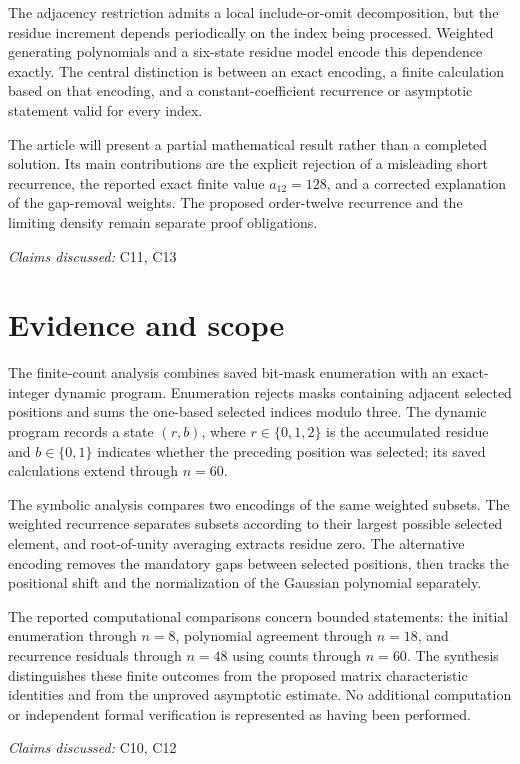 \documentclass[11pt]{article}
\begin{document}
The adjacency restriction admits a local include-or-omit decomposition, but the residue increment depends periodically on the index being processed. Weighted generating polynomials and a six-state residue model encode this dependence exactly. The central distinction is between an exact encoding, a finite calculation based on that encoding, and a constant-coefficient recurrence or asymptotic statement valid for every index.

The article will present a partial mathematical result rather than a completed solution. Its main contributions are the explicit rejection of a misleading short recurrence, the reported exact finite value $a_{12}=128$, and a corrected explanation of the gap-removal weights. The proposed order-twelve recurrence and the limiting density remain separate proof obligations.

\textit{Claims discussed: }C11, C13
\section{Evidence and scope}
The finite-count analysis combines saved bit-mask enumeration with an exact-integer dynamic program. Enumeration rejects masks containing adjacent selected positions and sums the one-based selected indices modulo three. The dynamic program records a state $(r,b)$, where $r\in\{0,1,2\}$ is the accumulated residue and $b\in\{0,1\}$ indicates whether the preceding position was selected; its saved calculations extend through $n=60$.

The symbolic analysis compares two encodings of the same weighted subsets. The weighted recurrence separates subsets according to their largest possible selected element, and root-of-unity averaging extracts residue zero. The alternative encoding removes the mandatory gaps between selected positions, then tracks the positional shift and the normalization of the Gaussian polynomial separately.

The reported computational comparisons concern bounded statements: the initial enumeration through $n=8$, polynomial agreement through $n=18$, and recurrence residuals through $n=48$ using counts through $n=60$. The synthesis distinguishes these finite outcomes from the proposed matrix characteristic identities and from the unproved asymptotic estimate. No additional computation or independent formal verification is represented as having been performed.

\textit{Claims discussed: }C10, C12
\end{document}
